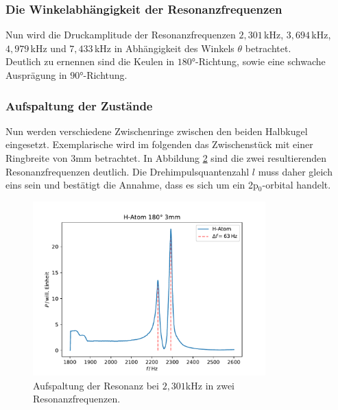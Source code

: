 \subsubsection{Die Winkelabhängigkeit der Resonanzfrequenzen}
Nun wird die Druckamplitude der Resonanzfrequenzen $2,301\,$kHz, $3,694\,$kHz, $4,979\,$kHz und $7,433\,$kHz 
in Abhängigkeit des Winkels $\theta$ betrachtet.\\
Deutlich zu ernennen sind die Keulen in $180°$-Richtung, sowie eine schwache Ausprägung in $90°$-Richtung.

\begin{figure}[H]
    \centering
    \hfil
    \hfil 
    
    \hfil
    \hfil 
    \caption{}\label{figure}
\end{figure}
\subsubsection*{Aufspaltung der Zustände}
Nun werden verschiedene Zwischenringe zwischen den beiden Halbkugel eingesetzt. Exemplarische wird im folgenden das Zwischenstück
mit einer Ringbreite von $3$mm betrachtet. In Abbildung \ref{fig:aufspaltung} sind die zwei resultierenden Resonanzfrequenzen
deutlich. Die Drehimpulsquantenzahl $l$ muss daher gleich eins sein und bestätigt die Annahme, dass es sich um ein 2p$_0$-orbital handelt.  

\begin{figure}[H]
    \center
    \includegraphics[width=0.8\textwidth]{plots/Hatom/zustandsaufspaltung.pdf}
    \caption{Aufspaltung der Resonanz bei $2,301$kHz in zwei Resonanzfrequenzen.}
    \label{fig:aufspaltung}
\end{figure}

